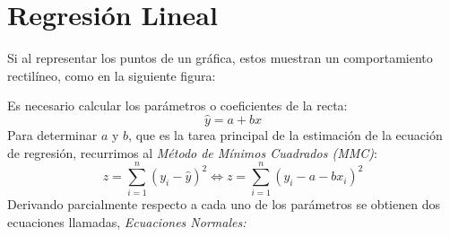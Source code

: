 \section{Regresión Lineal}
Si al representar los puntos de un gráfica, estos muestran un comportamiento rectilíneo, como en la siguiente figura:

Es necesario calcular los parámetros o coeficientes de la recta:
$$\hat{y}=a+bx$$
Para determinar $a$ y $b$, que es la tarea principal de la estimación de la ecuación de regresión, recurrimos al \textit{Método de Mínimos Cuadrados (MMC)}:
$$z=\sum_{i=1}^{n}(y_i-\hat{y})^2 \Leftrightarrow z=\sum_{i=1}^{n}(y_i-a-bx_i)^2$$
Derivando parcialmente respecto a cada uno de los parámetros se obtienen dos ecuaciones llamadas, \textit{Ecuaciones Normales:}